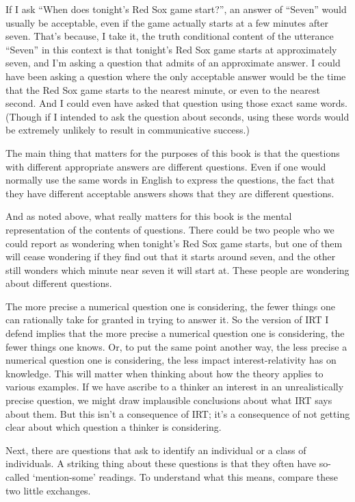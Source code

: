 \documentclass[
  11pt,
]{book}
\begin{document}
If I ask ``When does tonight's Red Sox game start?'', an answer of ``Seven'' would usually be acceptable, even if the game actually starts at a few minutes after seven. That's because, I take it, the truth conditional content of the utterance ``Seven'' in this context is that tonight's Red Sox game starts at approximately seven, and I'm asking a question that admits of an approximate answer. I could have been asking a question where the only acceptable answer would be the time that the Red Sox game starts to the nearest minute, or even to the nearest second. And I could even have asked that question using those exact same words. (Though if I intended to ask the question about seconds, using these words would be extremely unlikely to result in communicative success.)

The main thing that matters for the purposes of this book is that the questions with different appropriate answers are different questions. Even if one would normally use the same words in English to express the questions, the fact that they have different acceptable answers shows that they are different questions.

And as noted above, what really matters for this book is the mental representation of the contents of questions. There could be two people who we could report as wondering when tonight's Red Sox game starts, but one of them will cease wondering if they find out that it starts around seven, and the other still wonders which minute near seven it will start at. These people are wondering about different questions.

The more precise a numerical question one is considering, the fewer things one can rationally take for granted in trying to answer it. So the version of IRT I defend implies that the more precise a numerical question one is considering, the fewer things one knows. Or, to put the same point another way, the less precise a numerical question one is considering, the less impact interest-relativity has on knowledge. This will matter when thinking about how the theory applies to various examples. If we have ascribe to a thinker an interest in an unrealistically precise question, we might draw implausible conclusions about what IRT says about them. But this isn't a consequence of IRT; it's a consequence of not getting clear about which question a thinker is considering.

Next, there are questions that ask to identify an individual or a class of individuals. A striking thing about these questions is that they often have so-called `mention-some' readings. To understand what this means, compare these two little exchanges.
\end{document}
